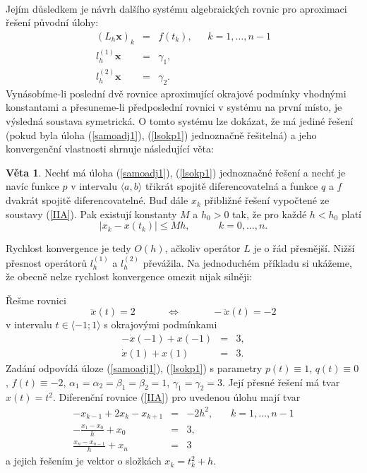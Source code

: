 \documentclass[a4paper, 12pt]{book}
\theoremstyle{definition}
\newtheorem{theorem}{Věta}[section]
\def\vc#1{\mathbf{\boldsymbol{#1}}}     %
\begin{document}
~

Jejím důsledkem je návrh dalšího systému algebraických rovnic pro aproximaci řešení 
původní úlohy:
\begin{equation}\label{IIA}
\begin{array}{rcl}
(L_h \vc x)_k &=& f(t_k), ~~~~~~~k=1,\dots,n-1\\
l_h^{(1)} \vc x &=& \gamma_1,\\
l_h^{(2)} \vc x &=& \gamma_2.
\end{array}
\end{equation}
Vynásobíme-li poslední dvě rovnice aproximující okrajové podmínky vhodnými 
konstantami a přesuneme-li předposlední rovnici v systému na první místo, 
je výsledná soustava symetrická. O tomto systému lze dokázat, že má 
jediné řešení (pokud byla úloha (\ref{samoadj1}), (\ref{lsokp1}) jednoznačně
řešitelná) a jeho konvergenční vlastnosti shrnuje následující věta:
\begin{theorem}\label{V3.7}
Nechť má úloha (\ref{samoadj1}), (\ref{lsokp1}) jednoznačné řešení a nechť
je navíc funkce $p$ v intervalu $\langle a,b\rangle$ třikrát spojitě 
diferencovatelná a funkce $q$ a $f$ dvakrát spojitě diferencovatelné. 
Buď dále $x_k$ přibližné řešení vypočtené ze soustavy (\ref{IIA}). Pak 
existují konstanty $M$ a $h_0>0$ tak, že pro každé $h<h_0$ platí
\begin{displaymath}
|x_k-x(t_k)|\leq Mh, ~~~~~~~~~~~~~ k=0,\dots, n.
\end{displaymath}
\end{theorem}
Rychlost konvergence je tedy $O(h)$, ačkoliv operátor $L$ je o řád 
přesnější. Nižší přesnost operátorů $l_h^{(1)}$ a $l_h^{(2)}$ převážila.
Na jednoduchém příkladu si ukážeme, že obecně nelze rychlost konvergence 
omezit nijak silněji:

Řešme rovnici 
\begin{equation}\label{uloha1}
\ddot x(t)=2~~~~~~~~~~~~~~\Leftrightarrow~~~~~~~~~~~~~~-\ddot x(t)=-2
\end{equation}
v intervalu $t\in\langle -1;1\rangle$ 
s okrajovými podmínkami 
\begin{equation}\label{uloha2}
\begin{array}{rcl}
-\dot x(-1)+x(-1)&=&3,\\
\dot x(1)+x(1)&=&3.
\end{array}
\end{equation}
Zadání odpovídá úloze (\ref{samoadj1}), (\ref{lsokp1}) s parametry $p(t)\equiv 1$,
$q(t)\equiv 0$, $f(t)\equiv -2$, $\alpha_1=\alpha_2=\beta_1=\beta_2=1$, 
$\gamma_1=\gamma_2=3$. Její přesné řešení má tvar $x(t)=t^2$. Diferenční rovnice 
(\ref{IIA}) pro uvedenou úlohu mají tvar
\begin{displaymath}
\begin{array}{rcl}
-x_{k-1}+2x_k-x_{k+1} &=& -2h^2,~~~~~~~~k=1,\dots,n-1\\
-\frac{x_1-x_0}h+x_0&=& 3,\\
\frac{x_n-x_{n-1}}h+x_n&=& 3
\end{array}
\end{displaymath}
a jejich řešením je vektor o složkách $x_k=t_k^2+h$.
\end{document}
